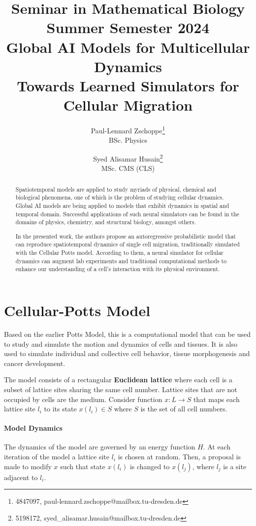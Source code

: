 \documentclass[a4paper,10pt,twocolumn]{article}
\date{}
\title{
    \small
    {\large Seminar in Mathematical Biology}\\
    Summer Semester 2024\\
    \vspace{1em}
    {\LARGE\bfseries Global AI Models for Multicellular Dynamics} \\ 
    {\Large Towards Learned Simulators for Cellular Migration}
}
\author{
    Paul-Lennard Zschoppe\footnote{4847097, paul-lennard.zschoppe@mailbox.tu-dresden.de}\\
    {\small BSc. Physics}
    \and
    Syed Alisamar Husain\footnote{5198172, syed\_alisamar.husain@mailbox.tu-dresden.de}\\
    {\small MSc. CMS (CLS)}
}
\begin{document}
    \maketitle

    \begin{abstract}
        Spatiotemporal models are applied to study myriads of physical, chemical and biological
        phenomena, one of which is the problem of studying cellular dynamics.
        Global AI models are being applied to models that exhibit dynamics in spatial 
        and temporal domain. Successful applications of such neural simulators can be found in the 
        domains of physics, chemistry, and structural biology, amongst others. 

        In the presented work, the authors propose an autoregressive probabilistic model that can reproduce 
        spatiotemporal dynamics of single cell migration, traditionally simulated with the 
        Cellular Potts model. 
        According to them, a neural simulator for cellular dynamics can augment lab experiments and 
        traditional computational methods to enhance our understanding of a cell's interaction 
        with its physical environment. 
    \end{abstract}



    \section{Cellular-Potts Model}
        Based on the earlier Potts Model\cite{potts_model}, this is a computational model that can be used to study and simulate
        the motion and dynamics of cells and tissues. It is also used to simulate 
        individual and collective cell behavior, tissue morphogenesis and cancer development.
        
        The model consists of a rectangular {\bfseries Euclidean lattice} where each cell is a subset 
        of lattice sites sharing the same cell number. Lattice sites that are not occupied by 
        cells are the medium. 
        Consider function $x: L \to S$ that maps each lattice site $l_i$ to its state 
        $x(l_i) \in S$ where $S$ is the set of all cell numbers.

        \paragraph{Model Dynamics}
        The dynamics of the model are governed by an energy function $H$.
        At each iteration of the model a lattice site $l_i$ is chosen at random.
        Then, a proposal is made to modify $x$ such that state $x(l_i)$ is changed to 
        $x(l_j)$, where $l_j$ is a site adjacent to $l_i$.
\end{document}
